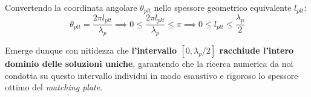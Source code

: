 Convertendo la coordinata angolare $\theta_{plt}$ nello spessore geometrico equivalente $l_{plt}$:
\begin{equation}
    \theta_{plt} = \frac{2\pi l_{plt}}{\lambda_p} \implies 0 \le \frac{2\pi l_{plt}}{\lambda_p} \le \pi \implies 0 \le l_{plt} \le \frac{\lambda_p}{2}
    \label{eq:a1_12}
\end{equation}

Emerge dunque con nitidezza che \textbf{l'intervallo $[0, \lambda_p/2]$ racchiude l'intero dominio delle soluzioni uniche}, garantendo che la ricerca numerica da noi condotta su questo intervallo individui in modo esaustivo e rigoroso lo spessore ottimo del \textit{matching plate}.
